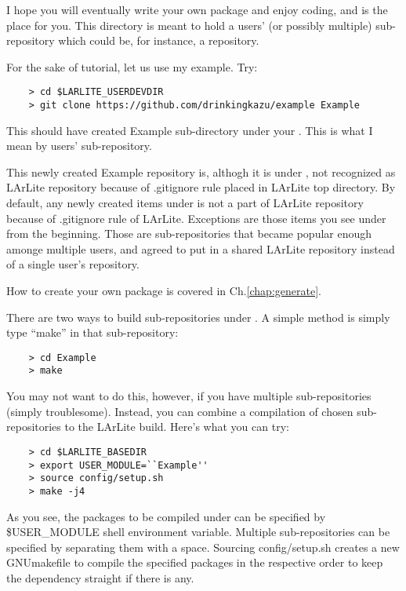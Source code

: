 I hope you will eventually write your own package and enjoy coding, and \UserDev is the place for you.
This directory \UserDev is meant to hold a users' (or possibly multiple) sub-repository which could be, for instance, a \git repository.

For the sake of tutorial, let us use my example. Try:
\begin{lstlisting}
    > cd $LARLITE_USERDEVDIR
    > git clone https://github.com/drinkingkazu/example Example
\end{lstlisting}
This should have created {\ttfamily Example} sub-directory under your \UserDev.
This is what I mean by users' sub-repository.

This newly created {\ttfamily Example} repository is, althogh it is under \UserDev, not recognized as
LArLite repository because of {\ttfamily .gitignore} rule placed in LArLite top directory.
By default, any newly created items under \UserDev is not a part of LArLite repository because of {\ttfamily .gitignore} rule of LArLite.
Exceptions are those items you see under \UserDev from the beginning.
Those are sub-repositories that became popular enough amonge multiple users, and agreed to put in a shared LArLite repository instead
of a single user's \git repository. 

How to create your own package is covered in Ch.\ref{chap:generate}.

There are two ways to build sub-repositories under \UserDev.
A simple method is simply type ``make'' in that sub-repository:
\begin{lstlisting}
    > cd Example
    > make
\end{lstlisting}

You may not want to do this, however, if you have multiple sub-repositories (simply troublesome).
Instead, you can combine a compilation of chosen sub-repositories to the LArLite build.
Here's what you can try:
\begin{lstlisting}
    > cd $LARLITE_BASEDIR
    > export USER_MODULE=``Example''
    > source config/setup.sh
    > make -j4
\end{lstlisting}
As you see, the packages to be compiled under \UserDev can be specified by {\ttfamily \$USER\_MODULE} shell environment variable.
Multiple sub-repositories can be specified by separating them with a space.
Sourcing {\ttfamily config/setup.sh} creates a new GNUmakefile to compile the specified packages in the respective order to keep the dependency straight if there is any.


